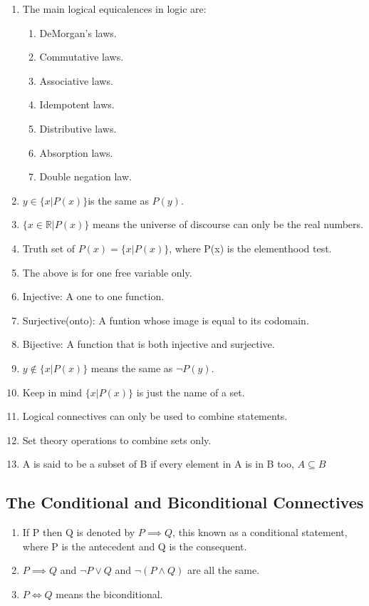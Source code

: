 \documentclass{article}
\begin{document}
\begin{enumerate}
	  \item The main logical equicalences in logic are:
		  \begin{enumerate}
			  \item DeMorgan's laws.
			  \item Commutative laws.
			  \item Associative laws.
			  \item Idempotent laws.
			  \item Distributive laws.
			  \item Absorption laws.
			  \item Double negation law.
		  \end{enumerate} 
	  \item $y \in \{x | P(x)\} $is the same as $P(y).$
	  \item $\{x \in \mathbb{R} | P(x)\} $ means the universe of discourse can only be the real numbers.
	  \item Truth set of $P(x) = \{x | P(x)\}$, where P(x) is the elementhood test.
	  \item The above is for one free variable only.
	  \item Injective: A one to one function.
	  \item Surjective(onto): A funtion whose image is equal to its codomain.
	  \item Bijective: A function that is both injective and surjective.
	  \item $y \not\in \{x | P(x)\}$ means the same as $\lnot P(y)$.
	  \item Keep in mind $\{x | P(x)\}$ is just the name of a set.
	  \item Logical connectives can only be used to combine statements.
	  \item Set theory operations to combine sets only.
	  \item A is said to be a subset of B if every element in A is in B too, $A \subseteq B$
	\end{enumerate}
	\subsection{The Conditional and Biconditional Connectives}
	\begin{enumerate}
		\item If P then Q is denoted by $P \implies Q$, this known as a conditional statement, where P is the antecedent and Q is the consequent.
		\item $P \implies Q$ and $\lnot P \lor Q$ and $ \lnot (P \land Q)$ are all the same.
            \item $P\Leftrightarrow Q$ means the biconditional.

	\end{enumerate}
\end{document}
